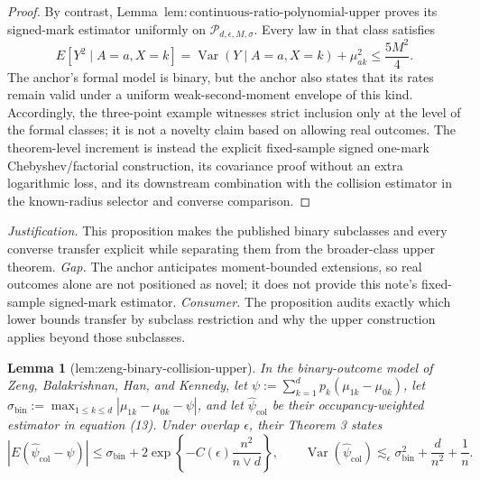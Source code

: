 \documentclass{article}
\newtheorem{lemma}{Lemma}
\begin{document}
\begin{proof}
By contrast, Lemma~\(\mathrm{lem:continuous\text{-}ratio\text{-}polynomial\text{-}upper}\) proves its signed-mark estimator uniformly on \(\mathcal P_{d,\epsilon,M,\sigma}\).  Every law in that class satisfies
\[
 E[Y^2\mid A=a,X=k]
 =\operatorname{Var}(Y\mid A=a,X=k)+\mu_{ak}^2
 \le\frac{5M^2}{4}.
\tag{8}
\]
The anchor's formal model is binary, but the anchor also states that its rates remain valid under a uniform weak-second-moment envelope of this kind.  Accordingly, the three-point example witnesses strict inclusion only at the level of the formal classes; it is not a novelty claim based on allowing real outcomes.  The theorem-level increment is instead the explicit fixed-sample signed one-mark Chebyshev/factorial construction, its covariance proof without an extra logarithmic loss, and its downstream combination with the collision estimator in the known-radius selector and converse comparison.
\end{proof}
\par\smallskip\noindent \textit{Justification.} This proposition makes the published binary subclasses and every converse transfer explicit while separating them from the broader-class upper theorem. \textit{Gap.} The anchor anticipates moment-bounded extensions, so real outcomes alone are not positioned as novel; it does not provide this note's fixed-sample signed-mark estimator. \textit{Consumer.} The proposition audits exactly which lower bounds transfer by subclass restriction and why the upper construction applies beyond those subclasses.

\begin{lemma}[lem:zeng-binary-collision-upper]\label{lem:zeng-binary-collision-upper}
In the binary-outcome model of Zeng, Balakrishnan, Han, and Kennedy, let \(\psi:=\sum_{k=1}^dp_k(\mu_{1k}-\mu_{0k})\), let \(\sigma_{\mathrm{bin}}:=\max_{1\le k\le d}|\mu_{1k}-\mu_{0k}-\psi|\), and let \(\widehat\psi_{\mathrm{col}}\) be their occupancy-weighted estimator in equation (13).  Under overlap \(\epsilon\), their Theorem 3 states
\[
 |E(\widehat\psi_{\mathrm{col}}-\psi)|
 \le \sigma_{\mathrm{bin}}+2\exp\left\{-C(\epsilon)\frac{n^2}{n\vee d}\right\},
 \qquad
 \operatorname{Var}(\widehat\psi_{\mathrm{col}})
 \lesssim_{\epsilon}\sigma_{\mathrm{bin}}^2+\frac d{n^2}+\frac1n.
\]
\end{lemma}
\end{document}

